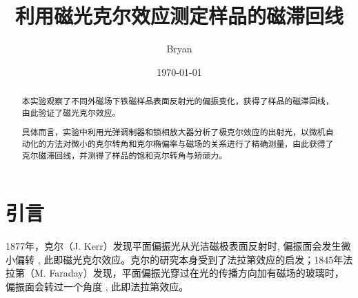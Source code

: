 \documentclass[aps,pre,12pt,preprint,%
	onecolumn,showpacs,showkeys,nofootinbib]{revtex4-1}
\begin{document}
	\title{%
	\texstringonly{\hfil\\[2\baselineskip]}
	\sf\LARGE%
		利用磁光克尔效应测定样品的磁滞回线%
	\texstringonly{\vspace{3ex}}}
	\author{\fangsong\large%
		Bryan%
	\vspace{2mm}}
	\date{\today}

\begin{abstract}
\vspace{10mm}
\begin{spacing}{1.5}\normalsize
\setlength{\parskip}{.3\baselineskip}
	本实验观察了不同外磁场下铁磁样品表面反射光的偏振变化，获得了样品的磁滞回线，由此验证了磁光克尔效应。
	
	具体而言，实验中利用光弹调制器和锁相放大器分析了极克尔效应的出射光，以微机自动化的方法对微小的克尔转角和克尔椭偏率与磁场的关系进行了精确测量，由此获得了克尔磁滞回线，并测得了样品的饱和克尔转角与矫顽力。
\end{spacing}
\end{abstract}

\maketitle
\thispagestyle{titlepagestyle}

\section{引言}
\vspace{-.5\baselineskip}
	1877年，克尔（J. Kerr）发现平面偏振光从光洁磁极表面反射时, 偏振面会发生微小偏转 \cite{kerr1877xliii}, 此即磁光克尔效应。克尔的研究本身受到了法拉第效应的启发；1845年法拉第（M. Faraday）发现，平面偏振光穿过在光的传播方向加有磁场的玻璃时，偏振面会转过一个角度 \cite{faraday1933faraday}, 此即法拉第效应。
	
\end{document}
